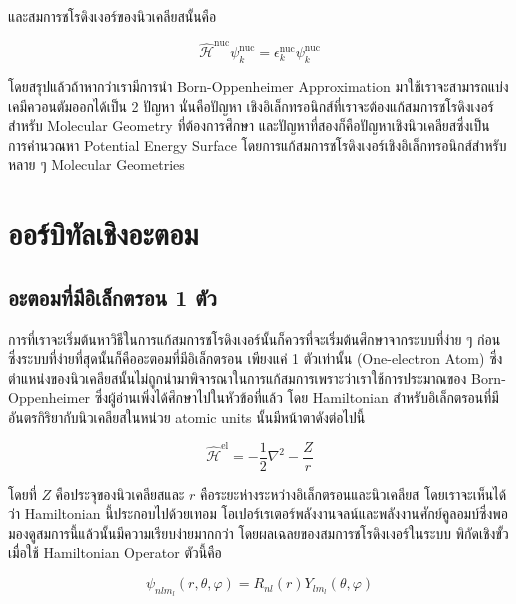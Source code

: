 \noindent และสมการชโรดิงเงอร์ของนิวเคลียสนั้นคือ

\begin{equation}
    \label{eq:schrodinger_equation_nuclei}
    \hat{\mathscr{H}}^{\text{nuc}} \psi^{\text{nuc}}_{k} 
    = \epsilon^{\text{nuc}}_{k} \psi^{\text{nuc}}_{k}
\end{equation}

โดยสรุปแล้วถ้าหากว่าเรามีการนำ Born-Oppenheimer Approximation มาใช้เราจะสามารถแบ่งเคมีควอนตัมออกได้เป็น 2 ปัญหา นั่นคือปัญหา%
เชิงอิเล็กทรอนิกส์ที่เราจะต้องแก้สมการชโรดิงเงอร์สำหรับ Molecular Geometry ที่ต้องการศึกษา และปัญหาที่สองก็คือปัญหาเชิงนิวเคลียสซึ่งเป็น%
การคำนวณหา Potential Energy Surface โดยการแก้สมการชโรดิงเงอร์เชิงอิเล็กทรอนิกส์สำหรับหลาย ๆ Molecular Geometries

\section{ออร์บิทัลเชิงอะตอม}

\subsection{อะตอมที่มีอิเล็กตรอน 1 ตัว}

การที่เราจะเริ่มต้นหาวิธีในการแก้สมการชโรดิงเงอร์นั้นก็ควรที่จะเริ่มต้นศึกษาจากระบบที่ง่าย ๆ ก่อนซึ่งระบบที่ง่ายที่สุดนั้นก็คืออะตอมที่มีอิเล็กตรอน%
เพียงแค่ 1 ตัวเท่านั้น (One-electron Atom)  ซึ่งตำแหน่งของนิวเคลียสนั้นไม่ถูกนำมาพิจารณาในการแก้สมการเพราะว่าเราใช้การประมาณของ 
Born-Oppenheimer ซึ่งผู้อ่านเพิ่งได้ศึกษาไปในหัวข้อที่แล้ว โดย Hamiltonian สำหรับอิเล็กตรอนที่มีอันตรกิริยากับนิวเคลียสในหน่วย atomic 
units นั้นมีหน้าตาดังต่อไปนี้

\begin{equation}
    \hat{\mathscr{H}}^{\text{el}} = -\frac{1}{2} \nabla^{2}-\frac{Z}{r}
\end{equation}

โดยที่ $Z$ คือประจุของนิวเคลียสและ $r$ คือระยะห่างระหว่างอิเล็กตรอนและนิวเคลียส โดยเราจะเห็นได้ว่า Hamiltonian นี้ประกอบไปด้วยเทอม%
โอเปอร์เรเตอร์พลังงานจลน์และพลังงานศักย์คูลอมบ์ซึ่งพอมองดูสมการนี้แล้วนั้นมีความเรียบง่ายมากกว่า โดยผลเฉลยของสมการชโรดิงเงอร์ในระบบ%
พิกัดเชิงขั้วเมื่อใช้ Hamiltonian Operator ตัวนี้คือ

\begin{equation}
    \psi_{nlm_{l}} (r, \theta, \varphi) = R_{nl}(r) Y_{lm_{l}} (\theta, \varphi)
\end{equation}

